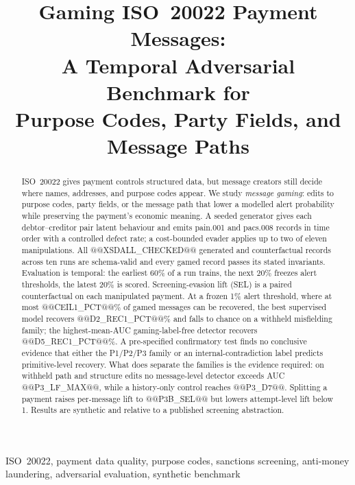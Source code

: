 \documentclass[conference]{IEEEtran}
\newif\ifanonymous
\begin{document}
\title{Gaming ISO~20022 Payment Messages:\\
A Temporal Adversarial Benchmark for\\
Purpose Codes, Party Fields, and Message Paths}
\ifanonymous
\author{\IEEEauthorblockN{Author names withheld for double-blind review}
\IEEEauthorblockA{Affiliations withheld for double-blind review}}
\else
\author{
}
\fi
\maketitle
\begin{abstract}
ISO~20022 gives payment controls structured data, but message creators still
decide where names, addresses, and purpose codes appear. We study
\emph{message gaming}: edits to purpose codes, party fields, or the message
path that lower a modelled alert probability while preserving the payment's
economic meaning. A seeded generator gives each debtor--creditor pair latent
behaviour and emits pain.001 and pacs.008 records in time order with a
controlled defect rate; a cost-bounded evader applies up to two of eleven
manipulations. All @@XSDALL_CHECKED@@ generated and counterfactual
records across ten runs are schema-valid and every gamed record passes its
stated invariants. Evaluation is temporal: the earliest 60\% of a run trains, the
next 20\% freezes alert thresholds, the latest 20\% is scored. Screening-evasion lift (SEL) is a paired
counterfactual on each manipulated payment. At a frozen 1\% alert threshold,
where at most @@CEIL1_PCT@@\% of gamed messages can be recovered, the best
supervised model recovers @@D2_REC1_PCT@@\% and falls to chance on a withheld
misfielding family; the highest-mean-AUC gaming-label-free detector
recovers @@D5_REC1_PCT@@\%. A pre-specified confirmatory test finds no conclusive
evidence that either the P1/P2/P3 family or an internal-contradiction label
predicts primitive-level recovery. What does separate the families is the
evidence required: on withheld path and structure edits no message-level
detector exceeds AUC @@P3_LF_MAX@@, while a history-only control reaches
@@P3_D7@@. Splitting a payment raises per-message lift to @@P3B_SEL@@ but
lowers attempt-level lift below 1. Results are synthetic and relative to
a published screening abstraction.
\end{abstract}
\begin{IEEEkeywords}
ISO~20022, payment data quality, purpose codes, sanctions screening,
anti-money laundering, adversarial evaluation, synthetic benchmark
\end{IEEEkeywords}
\end{document}
